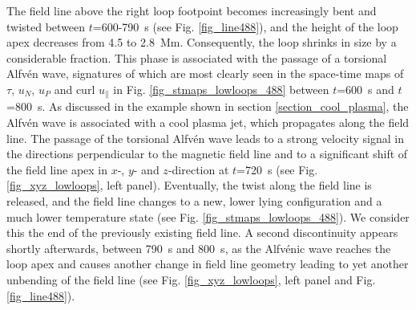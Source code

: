 \documentclass{aa}
\begin{document}
{%
The field line above the right loop footpoint becomes increasingly {\color{red}bent and twisted} between $t$=600-790~s (see Fig. \ref{fig_line488}), and the height of the loop apex decreases from 4.5 to 2.8~Mm. Consequently, the loop shrinks in size by a considerable fraction. This phase is associated with the passage of a torsional Alfv\'en wave, signatures of which are most clearly seen in the space-time maps of $\tau$, $u_N$, $u_P$ and curl $u_{\parallel}$ in Fig. \ref{fig_stmaps_lowloops_488} between $t$=600~s and $t$=800~s. {\color{red}As discussed in the example shown in section \ref{section_cool_plasma}, the Alfv\'en wave is associated with a cool plasma jet, which propagates along the field line.}
The passage of the torsional Alfv\'en wave leads to a strong velocity signal in the directions perpendicular to the magnetic field line and to a significant shift of the field line apex in $x$-, $y$- and $z$-direction at $t$=720~s (see Fig. \ref{fig_xyz_lowloops}, left panel). Eventually, the {\color{red}twist} along the field line is released, and the field line changes to a new, lower lying configuration and a much lower temperature state (see Fig. \ref{fig_stmaps_lowloops_488}). {\color{red} We consider this the end of the previously existing field line.} A second discontinuity appears shortly afterwards, between 790~s and 800~s, as the Alfv\'enic wave reaches the loop apex and causes another change in field line geometry leading to yet another unbending of the field line (see Fig. \ref{fig_xyz_lowloops}, left panel and Fig. \ref{fig_line488}).



}
\end{document}
